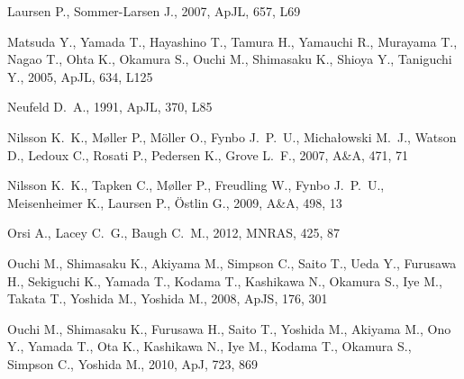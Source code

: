 \documentclass[usenatbib]{mn2e}
\newcommand{\apj}{ApJ}
\newcommand{\apjs}{ApJS}
\newcommand{\apjl}{ApJL}
\newcommand{\mnras}{MNRAS}
\newcommand{\aap}{A\&A}
\begin{document}
\begin{thebibliography}{}
{Laursen} P.,  {Sommer-Larsen} J.,  2007, \apjl, 657, L69

{Matsuda} Y.,  {Yamada} T.,  {Hayashino} T.,  {Tamura} H.,  {Yamauchi} R.,
  {Murayama} T.,  {Nagao} T.,  {Ohta} K.,  {Okamura} S.,  {Ouchi} M.,
  {Shimasaku} K.,  {Shioya} Y.,    {Taniguchi} Y.,  2005, \apjl, 634, L125

{Neufeld} D.~A.,  1991, \apjl, 370, L85

{Nilsson} K.~K.,  {M{\o}ller} P.,  {M{\"o}ller} O.,  {Fynbo} J.~P.~U.,
  {Micha{\l}owski} M.~J.,  {Watson} D.,  {Ledoux} C.,  {Rosati} P.,  {Pedersen}
  K.,    {Grove} L.~F.,  2007, \aap, 471, 71

{Nilsson} K.~K.,  {Tapken} C.,  {M{\o}ller} P.,  {Freudling} W.,  {Fynbo}
  J.~P.~U.,  {Meisenheimer} K.,  {Laursen} P.,    {{\"O}stlin} G.,  2009, \aap,
  498, 13

{Orsi} A.,  {Lacey} C.~G.,    {Baugh} C.~M.,  2012, \mnras, 425, 87

{Ouchi} M.,  {Shimasaku} K.,  {Akiyama} M.,  {Simpson} C.,  {Saito} T.,  {Ueda}
  Y.,  {Furusawa} H.,  {Sekiguchi} K.,  {Yamada} T.,  {Kodama} T.,  {Kashikawa}
  N.,  {Okamura} S.,  {Iye} M.,  {Takata} T.,  {Yoshida} M.,    {Yoshida} M.,
  2008, \apjs, 176, 301

{Ouchi} M.,  {Shimasaku} K.,  {Furusawa} H.,  {Saito} T.,  {Yoshida} M.,
  {Akiyama} M.,  {Ono} Y.,  {Yamada} T.,  {Ota} K.,  {Kashikawa} N.,  {Iye} M.,
   {Kodama} T.,  {Okamura} S.,  {Simpson} C.,    {Yoshida} M.,  2010, \apj,
  723, 869


\end{thebibliography}
\end{document}
